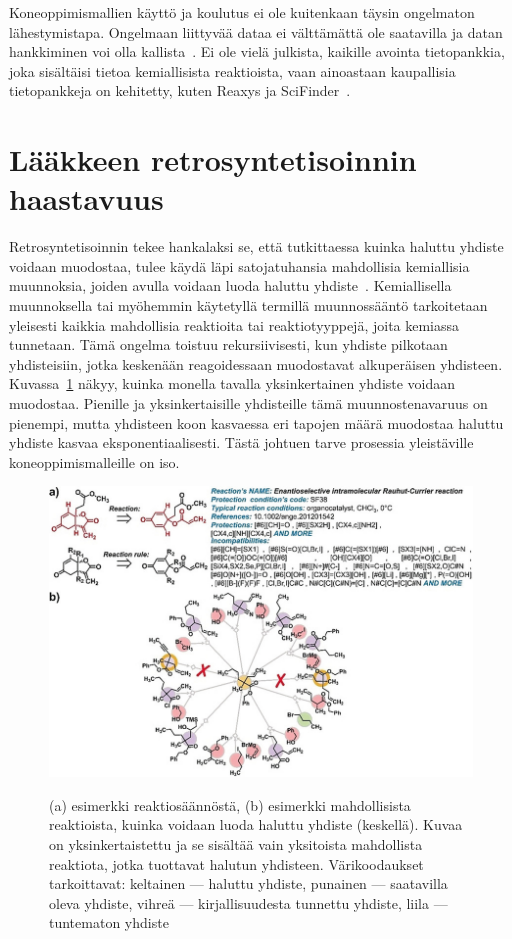 \documentclass[finnish,twoside,censored,tkt,sw-line]{HYthesisML}
\begin{document}
Koneoppimismallien käyttö ja koulutus ei ole kuitenkaan täysin ongelmaton lähestymistapa.
Ongelmaan liittyvää dataa ei välttämättä ole saatavilla ja datan hankkiminen voi olla kallista~\cite{deAlmeidaA.Filipa2019Socd}.
Ei ole vielä julkista, kaikille avointa tietopankkia, joka sisältäisi tietoa kemiallisista reaktioista, vaan ainoastaan kaupallisia tietopankkeja on kehitetty, kuten Reaxys ja SciFinder~\cite{deAlmeidaA.Filipa2019Socd}.

\section{Lääkkeen retrosyntetisoinnin haastavuus}

Retrosyntetisoinnin tekee hankalaksi se, että tutkittaessa kuinka haluttu yhdiste voidaan muodostaa, tulee käydä läpi satojatuhansia mahdollisia kemiallisia muunnoksia, joiden avulla voidaan luoda haluttu yhdiste~\cite{SeglerMarwinHS2018Pcsw}.
Kemiallisella muunnoksella tai myöhemmin käytetyllä termillä muunnossääntö tarkoitetaan yleisesti kaikkia mahdollisia reaktioita tai reaktiotyyppejä, joita kemiassa tunnetaan.
Tämä ongelma toistuu rekursiivisesti, kun yhdiste pilkotaan yhdisteisiin, jotka keskenään reagoidessaan muodostavat alkuperäisen yhdisteen.
Kuvassa~\ref{fig:retrosynthesis-example} näkyy, kuinka monella tavalla yksinkertainen yhdiste voidaan muodostaa.
Pienille ja yksinkertaisille yhdisteille tämä muunnostenavaruus on pienempi, mutta yhdisteen koon kasvaessa eri tapojen määrä muodostaa haluttu yhdiste kasvaa eksponentiaalisesti.
Tästä johtuen tarve prosessia yleistäville koneoppimismalleille on iso.

\begin{figure}[!ht]
    \centering
    \includegraphics[width=\textwidth]{retrosynthesis.jpg}
    \caption{(a) esimerkki reaktiosäännöstä, (b) esimerkki mahdollisista reaktioista, kuinka voidaan luoda haluttu yhdiste (keskellä).
        Kuvaa on yksinkertaistettu ja se sisältää vain yksitoista mahdollista reaktiota, jotka tuottavat halutun yhdisteen.
        Värikoodaukset tarkoittavat: keltainen --- haluttu yhdiste, punainen --- saatavilla oleva yhdiste, vihreä --- kirjallisuudesta tunnettu yhdiste, liila --- tuntematon yhdiste}
    {\cite{ExpertKnowledgeRetorsynthesis}}
    {\label{fig:retrosynthesis-example}}
\end{figure}
\end{document}
